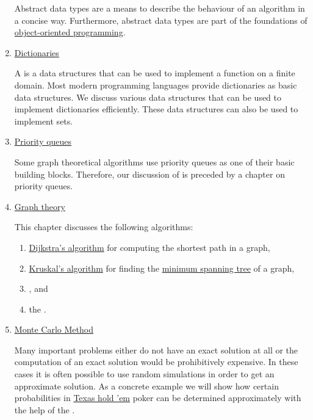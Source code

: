 \begin{enumerate}
      Abstract data types are a means to describe the behaviour of an algorithm in a concise way.
      Furthermore, abstract data types are part of the foundations of 
      \href{https://en.wikipedia.org/wiki/Object-oriented_programming}{object-oriented programming}. 
%  

\item \href{http://en.wikipedia.org/wiki/Map_(computer_science)}{Dictionaries}
  
      A  is a data structures that can be used to implement a function on a finite domain.
      Most modern programming languages provide dictionaries as basic data structures.  We discuss various data
      structures that can be used to implement dictionaries efficiently.   
      These data structures can also be used to implement sets.
\item \href{http://en.wikipedia.org/wiki/Priority_queue}{Priority queues}
  
      Some graph theoretical algorithms use priority queues as one of their basic building blocks.
      Therefore, our discussion of  is preceded by a chapter on priority queues.
\item \href{http://en.wikipedia.org/wiki/Graph_theory}{Graph theory}
  
      This chapter discusses the following algorithms:
      \begin{enumerate}
      \item \href{http://en.wikipedia.org/wiki/Dijkstra%27s_algorithm}{Dijkstra's algorithm}
            for computing the shortest path in a graph,
      \item \href{https://en.wikipedia.org/wiki/Kruskal%27s_algorithm}{Kruskal's algorithm} for finding the
            \href{https://en.wikipedia.org/wiki/Minimum_spanning_tree}{minimum spanning tree} of a graph,
      \item {}, and 
      \item the .
      \end{enumerate}
\item \href{http://en.wikipedia.org/wiki/Monte_Carlo_method}{Monte Carlo Method} 
 
      Many important problems either do not have an exact solution at all or the computation of an
      exact solution would be prohibitively expensive.  In these cases it is often possible to use 
      random simulations in order to get an approximate solution.  As a concrete example we will show
      how certain probabilities in \href{http://en.wikipedia.org/wiki/Texas_hold_%27em}{Texas hold 'em} 
      poker can be determined approximately with the help of the .
\end{enumerate}
